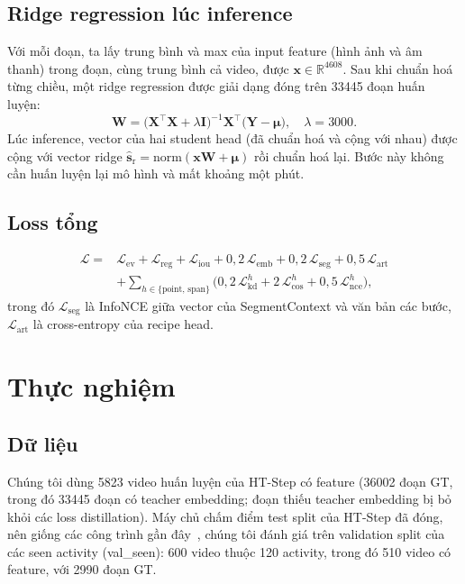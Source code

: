 \documentclass{IEEEtran}
\begin{document}
\subsection{Ridge regression lúc inference}
Với mỗi đoạn, ta lấy trung bình và max của input feature (hình ảnh và âm thanh) trong đoạn, cùng trung bình cả video, được $\mathbf{x} \in \mathbb{R}^{4608}$. Sau khi chuẩn hoá từng chiều, một ridge regression được giải dạng đóng trên 33445 đoạn huấn luyện:
\begin{equation}
\label{eq:ridge}
\mathbf{W} = \big(\mathbf{X}^{\top}\mathbf{X} + \lambda \mathbf{I}\big)^{-1} \mathbf{X}^{\top} \big(\mathbf{Y} - \boldsymbol{\mu}\big), \quad \lambda = 3000.
\end{equation}
Lúc inference, vector của hai student head (đã chuẩn hoá và cộng với nhau) được cộng với vector ridge $\hat{\mathbf{s}}_{\mathrm{r}} = \mathrm{norm}(\mathbf{x}\mathbf{W} + \boldsymbol{\mu})$ rồi chuẩn hoá lại. Bước này không cần huấn luyện lại mô hình và mất khoảng một phút.

\subsection{Loss tổng}
\begin{equation}
\label{eq:total}
\begin{split}
\mathcal{L} = {} & \mathcal{L}_{\mathrm{ev}} + \mathcal{L}_{\mathrm{reg}} + \mathcal{L}_{\mathrm{iou}} + 0{,}2\,\mathcal{L}_{\mathrm{emb}} + 0{,}2\,\mathcal{L}_{\mathrm{seg}} + 0{,}5\,\mathcal{L}_{\mathrm{art}} \\
& + \sum_{h \in \{\mathrm{point},\,\mathrm{span}\}} \big(0{,}2\,\mathcal{L}^{h}_{\mathrm{kd}} + 2\,\mathcal{L}^{h}_{\mathrm{cos}} + 0{,}5\,\mathcal{L}^{h}_{\mathrm{nce}}\big),
\end{split}
\end{equation}
trong đó $\mathcal{L}_{\mathrm{seg}}$ là InfoNCE giữa vector của SegmentContext và văn bản các bước, $\mathcal{L}_{\mathrm{art}}$ là cross-entropy của recipe head.

\section{Thực nghiệm}

\subsection{Dữ liệu}
Chúng tôi dùng 5823 video huấn luyện của HT-Step có feature (36002 đoạn GT, trong đó 33445 đoạn có teacher embedding; đoạn thiếu teacher embedding bị bỏ khỏi các loss distillation). Máy chủ chấm điểm test split của HT-Step đã đóng, nên giống các công trình gần đây~\cite{baglm,hsd}, chúng tôi đánh giá trên validation split của các seen activity (val\_seen): 600 video thuộc 120 activity, trong đó 510 video có feature, với 2990 đoạn GT.
\end{document}
